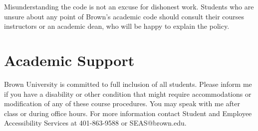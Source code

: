 \documentclass[11pt]{article}
\begin{document}
Misunderstanding the code is not an excuse for dishonest work. Students who are unsure about any point of Brown’s academic code should consult their courses instructors or an academic dean, who will be happy to explain the policy.

\section*{Academic Support}
Brown University is committed to full inclusion of all students.  Please inform me if you have a disability or other condition that might require accommodations or modification of any of these course procedures. You may speak with me after class or during office hours. For more information contact Student and Employee Accessibility Services at 401-863-9588 or SEAS@brown.edu.
\end{document}
